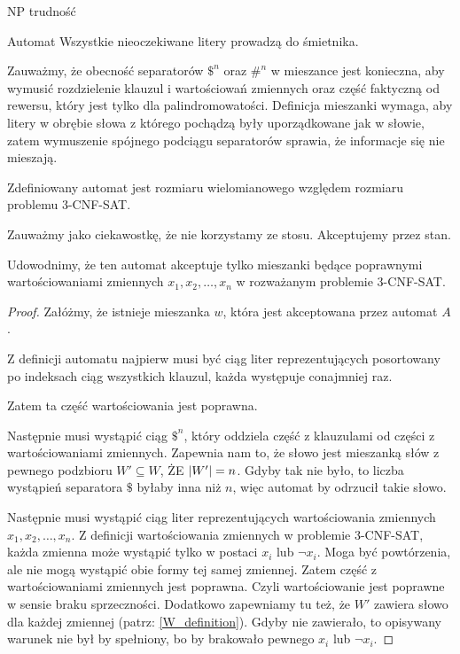 \documentclass{article}
\theoremstyle{definition}
\theoremstyle{remark}
\begin{document}
\begin{section}{NP trudność}
\begin{subsection}{Automat}
     Wszystkie nieoczekiwane litery prowadzą do śmietnika.

     Zauważmy, że obecność separatorów $ \$^n $ oraz $ \#^n $ w mieszance jest
     konieczna, aby wymusić rozdzielenie klauzul i wartościowań zmiennych oraz część
     faktyczną od rewersu, który jest tylko dla palindromowatości. Definicja
     mieszanki wymaga, aby litery w obrębie słowa z którego pochądzą były
     uporządkowane jak w słowie, zatem wymuszenie spójnego podciągu separatorów
     sprawia, że informacje się nie mieszają.

     Zdefiniowany automat jest rozmiaru wielomianowego względem rozmiaru problemu
     3-CNF-SAT.

     Zauważmy jako ciekawostkę, że nie korzystamy ze stosu. Akceptujemy przez stan.

     Udowodnimy, że ten automat akceptuje tylko mieszanki będące poprawnymi
     wartościowaniami zmiennych $x_1, x_2, \ldots, x_n$ w rozważanym problemie
     3-CNF-SAT.

     \begin{proof}
            Załóżmy, że istnieje mieszanka $w$, która jest akceptowana przez automat
            $A$. 

            Z definicji automatu najpierw musi być ciąg liter reprezentujących
            posortowany po indeksach ciąg wszystkich klauzul, każda występuje conajmniej raz.

            Zatem ta część wartościowania jest poprawna.

            Następnie musi wystąpić ciąg $ \$^n $, który oddziela część z klauzulami
            od części z wartościowaniami zmiennych. Zapewnia nam to, że słowo jest mieszanką słów 
            z pewnego podzbioru $W' \subseteq W$, ŻE $ \abs{W'} = n $. Gdyby tak nie było, to liczba
            wystąpień separatora $ \$ $ byłaby inna niż $n$, więc automat by odrzucił takie słowo.

            Następnie musi wystąpić ciąg liter reprezentujących wartościowania zmiennych
            $x_1, x_2, \ldots, x_n$. Z definicji wartościowania zmiennych w problemie
            3-CNF-SAT, każda zmienna może wystąpić tylko w postaci $x_i$ lub $\neg x_i$.
            Moga być powtórzenia, ale nie mogą wystąpić obie formy tej samej zmiennej.
            Zatem część z wartościowaniami zmiennych jest poprawna. Czyli wartościowanie jest poprawne w sensie braku sprzeczności.
            Dodatkowo zapewniamy tu też, że $W'$ zawiera słowo dla każdej zmiennej (patrz: \ref{W_definition}). Gdyby nie zawierało, to opisywany warunek
            nie był by spełniony, bo by brakowało pewnego $x_i$ lub $\neg x_i$.


\end{proof}
\end{subsection}
\end{section}
\end{document}
